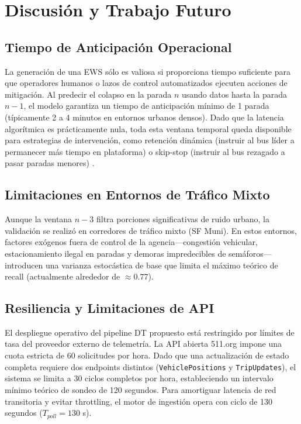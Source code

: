 \documentclass[journal,twocolumn]{IEEEtran}
\begin{document}
\section{Discusión y Trabajo Futuro}

\subsection{Tiempo de Anticipación Operacional}
La generación de una EWS sólo es valiosa si proporciona tiempo suficiente para que operadores humanos o lazos de control automatizados ejecuten acciones de mitigación. Al predecir el colapso en la parada $n$ usando datos hasta la parada $n-1$, el modelo garantiza un tiempo de anticipación mínimo de 1 parada (típicamente 2 a 4 minutos en entornos urbanos densos). Dado que la latencia algorítmica es prácticamente nula, toda esta ventana temporal queda disponible para estrategias de intervención, como retención dinámica (instruir al bus líder a permanecer más tiempo en plataforma) o skip-stop (instruir al bus rezagado a pasar paradas menores) \cite{10}.

\subsection{Limitaciones en Entornos de Tráfico Mixto}
Aunque la ventana $n-3$ filtra porciones significativas de ruido urbano, la validación se realizó en corredores de tráfico mixto (SF Muni). En estos entornos, factores exógenos fuera de control de la agencia---congestión vehicular, estacionamiento ilegal en paradas y demoras impredecibles de semáforos---introducen una varianza estocástica de base que limita el máximo teórico de recall (actualmente alrededor de $\approx 0.77$).

\subsection{Resiliencia y Limitaciones de API}
El despliegue operativo del pipeline DT propuesto está restringido por límites de tasa del proveedor externo de telemetría. La API abierta 511.org impone una cuota estricta de 60 solicitudes por hora. Dado que una actualización de estado completa requiere dos endpoints distintos (\texttt{VehiclePositions} y \texttt{TripUpdates}), el sistema se limita a 30 ciclos completos por hora, estableciendo un intervalo mínimo teórico de sondeo de 120 segundos. Para amortiguar latencia de red transitoria y evitar throttling, el motor de ingestión opera con ciclo de 130 segundos ($T_{poll}=130$ s).
\end{document}
